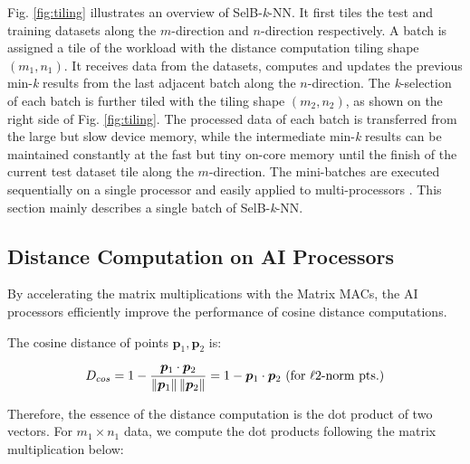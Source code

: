 Fig. \ref{fig:tiling} illustrates an overview of SelB-\textit{k}-NN. It first tiles the test and training datasets along the $m$-direction and $n$-direction respectively. A batch is assigned a tile of the workload with the distance computation tiling shape $(m_1, n_1)$. It receives data from the datasets, computes and updates the previous min-\textit{k} results from the last adjacent batch along the $n$-direction. The \textit{k}-selection of each batch is further tiled with the tiling shape $(m_2, n_2)$, as shown on the right side of Fig. \ref{fig:tiling}. The processed data of each batch is transferred from the large but slow device memory, while the intermediate min-\textit{k} results can be maintained constantly at the fast but tiny on-core memory until the finish of the current test dataset tile along the $m$-direction. The mini-batches are executed sequentially on a single processor and easily applied to multi-processors \cite{van2007superlinear}. This section mainly describes a single batch of SelB-\textit{k}-NN.

\subsection{Distance Computation on AI Processors}

By accelerating the matrix multiplications with the Matrix MACs, the AI processors efficiently improve the performance of cosine distance computations. 

The cosine distance of points $\boldsymbol{p}_{1}, \boldsymbol{p}_{2}$ is:

\begin{equation}
    \label{eq:cosine}
    \begin{aligned}
    D_{cos} = 1 - \frac{\boldsymbol{p}_{1} \cdot \boldsymbol{p}_{2}}
            {\left\| \boldsymbol{p}_{1} \right\| 
                \left\| \boldsymbol{p}_{2} \right\|}
        = 1 - \boldsymbol{p}_{1} \cdot \boldsymbol{p}_{2}\  (\textnormal{for } \ell\textnormal{2-norm pts.})
    \end{aligned}
    \end{equation}

Therefore, the essence of the distance computation is the dot product of two vectors. For $m_1 \times n_1$ data, we compute the dot products following the matrix multiplication below:

